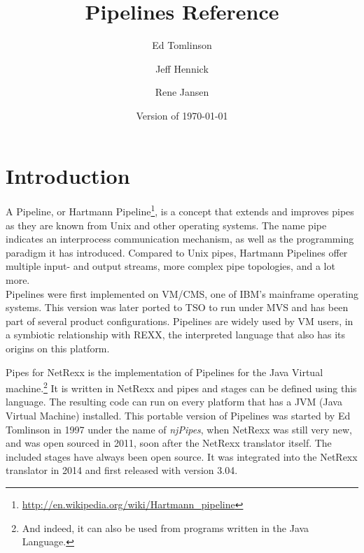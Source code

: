 

\renewcommand{\isbn}{978-90-819090-3-7}    
\setcounter{tocdepth}{1} 
\title{Pipelines Reference}
\author{Ed Tomlinson \and Jeff Hennick \and Rene Jansen}
\date{Version  of \today}
\maketitle
{}
\pagestyle{plain}
\frontmatter
{}
\pagestyle{plain}

\tableofcontents
\newpage
{}
\frontmatter
\large


\mainmatter
\chapter{Introduction}
A Pipeline, or Hartmann Pipeline\footnote{\url{http://en.wikipedia.org/wiki/Hartmann_pipeline}}, is a concept that extends and improves pipes as they are known from Unix and other operating systems. The name pipe indicates an interprocess communication mechanism, as well as the programming paradigm it has introduced. Compared to Unix pipes, Hartmann Pipelines offer multiple input- and output streams, more complex pipe topologies, and a lot more.\\

Pipelines were first implemented on VM/CMS, one of IBM's mainframe
operating systems. This version was later ported to TSO to run under
MVS and has been part of several product configurations. Pipelines are
widely used by VM users, in a symbiotic relationship with REXX, the
interpreted language that also has its origins on this platform.

Pipes for NetRexx is the implementation of Pipelines for the Java Virtual
machine.\footnote{And indeed, it can also be used from programs written
  in the Java Language.} It is written in NetRexx and pipes and stages can be defined using this
language. The resulting code can run on every platform that has a JVM
(Java Virtual Machine) installed. This portable version of Pipelines was started
by Ed Tomlinson in 1997 under the name of \emph{njPipes}, when NetRexx was
still very new, and was open sourced in 2011, soon after the NetRexx
translator itself. The included stages have always been open source. It was integrated into the NetRexx translator in
2014 and first released with version 3.04.

